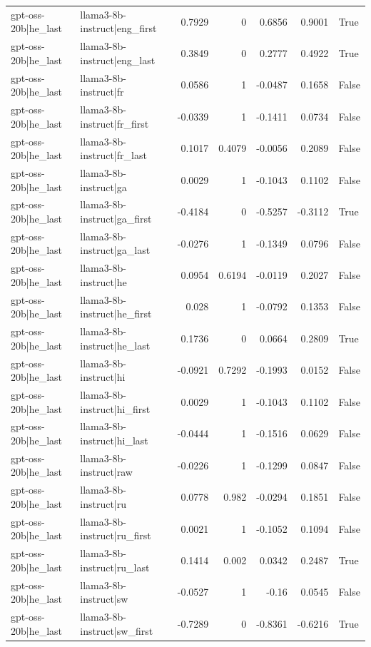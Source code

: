 \begin{table}
\begin{tabular}{l l r r r r l}
gpt-oss-20b|he_last & llama3-8b-instruct|eng_first & 0.7929 & 0 & 0.6856 & 0.9001 & True \\
gpt-oss-20b|he_last & llama3-8b-instruct|eng_last & 0.3849 & 0 & 0.2777 & 0.4922 & True \\
gpt-oss-20b|he_last & llama3-8b-instruct|fr & 0.0586 & 1 & -0.0487 & 0.1658 & False \\
gpt-oss-20b|he_last & llama3-8b-instruct|fr_first & -0.0339 & 1 & -0.1411 & 0.0734 & False \\
gpt-oss-20b|he_last & llama3-8b-instruct|fr_last & 0.1017 & 0.4079 & -0.0056 & 0.2089 & False \\
gpt-oss-20b|he_last & llama3-8b-instruct|ga & 0.0029 & 1 & -0.1043 & 0.1102 & False \\
gpt-oss-20b|he_last & llama3-8b-instruct|ga_first & -0.4184 & 0 & -0.5257 & -0.3112 & True \\
gpt-oss-20b|he_last & llama3-8b-instruct|ga_last & -0.0276 & 1 & -0.1349 & 0.0796 & False \\
gpt-oss-20b|he_last & llama3-8b-instruct|he & 0.0954 & 0.6194 & -0.0119 & 0.2027 & False \\
gpt-oss-20b|he_last & llama3-8b-instruct|he_first & 0.028 & 1 & -0.0792 & 0.1353 & False \\
gpt-oss-20b|he_last & llama3-8b-instruct|he_last & 0.1736 & 0 & 0.0664 & 0.2809 & True \\
gpt-oss-20b|he_last & llama3-8b-instruct|hi & -0.0921 & 0.7292 & -0.1993 & 0.0152 & False \\
gpt-oss-20b|he_last & llama3-8b-instruct|hi_first & 0.0029 & 1 & -0.1043 & 0.1102 & False \\
gpt-oss-20b|he_last & llama3-8b-instruct|hi_last & -0.0444 & 1 & -0.1516 & 0.0629 & False \\
gpt-oss-20b|he_last & llama3-8b-instruct|raw & -0.0226 & 1 & -0.1299 & 0.0847 & False \\
gpt-oss-20b|he_last & llama3-8b-instruct|ru & 0.0778 & 0.982 & -0.0294 & 0.1851 & False \\
gpt-oss-20b|he_last & llama3-8b-instruct|ru_first & 0.0021 & 1 & -0.1052 & 0.1094 & False \\
gpt-oss-20b|he_last & llama3-8b-instruct|ru_last & 0.1414 & 0.002 & 0.0342 & 0.2487 & True \\
gpt-oss-20b|he_last & llama3-8b-instruct|sw & -0.0527 & 1 & -0.16 & 0.0545 & False \\
gpt-oss-20b|he_last & llama3-8b-instruct|sw_first & -0.7289 & 0 & -0.8361 & -0.6216 & True \\

\end{tabular}
\end{table}

